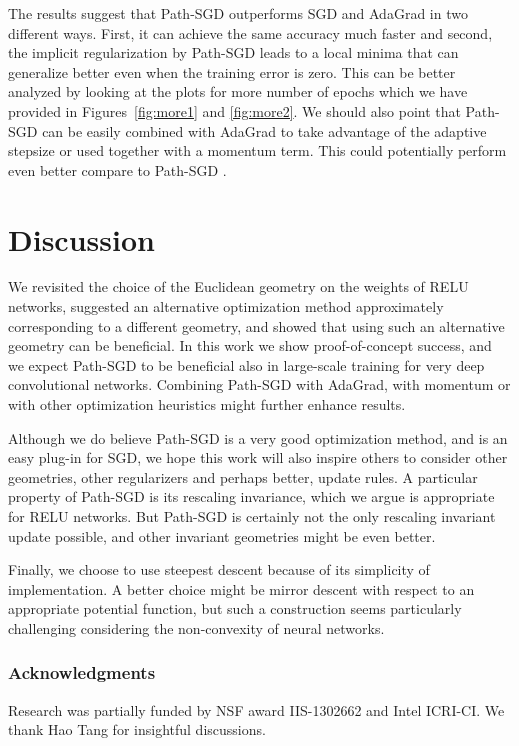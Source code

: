 \documentclass[11pt]{article}
\newcommand{\RSGD}{Path-SGD }
\begin{document}
The results suggest that \RSGD outperforms SGD and AdaGrad in two
different ways. First, it can achieve the same accuracy much faster
and second, the implicit regularization by \RSGD leads to a local
minima that can generalize better even when the training error is
zero. This can be better analyzed
by looking at the plots for more number of epochs which we have
provided in Figures~\ref{fig:more1} and \ref{fig:more2}. We should also point that
Path-SGD can be easily combined with AdaGrad to take advantage of the
adaptive stepsize or used together with a momentum term. This could
potentially perform even better compare to \RSGD.


\section{Discussion}

We revisited the choice of the Euclidean geometry on the weights of
RELU networks, suggested an alternative optimization method
approximately corresponding to a different geometry, and showed that
using such an alternative geometry can be beneficial.  In this work we show
proof-of-concept success, and we expect Path-SGD to be beneficial also
in large-scale training for very deep convolutional networks.
Combining Path-SGD with AdaGrad, with momentum or with other
optimization heuristics might further enhance results.

Although we do believe Path-SGD is a very good optimization method,
and is an easy plug-in for SGD, we hope this work will also inspire
others to consider other geometries, other regularizers and
perhaps better, update rules.
A particular property of Path-SGD is its rescaling invariance, which
we argue is appropriate for RELU networks.  But Path-SGD is certainly
not the only rescaling invariant update possible, and other invariant
geometries might be even better.

Finally, we choose to use steepest descent because of its simplicity
of implementation.  A better choice might be mirror descent with
respect to an appropriate potential function, but such a construction
seems particularly challenging considering the non-convexity of neural
networks.

\subsubsection*{Acknowledgments}
Research was partially funded by NSF award IIS-1302662 and Intel ICRI-CI. We thank Hao Tang for insightful discussions.
\end{document}
